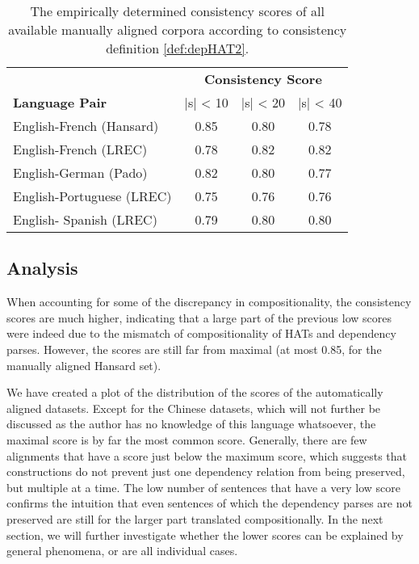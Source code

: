 \begin{table}[!ht]
\centering
\begin{tabular}{|l|c|c|c|}
\hline
&\multicolumn{3}{c|}{\textbf{Consistency Score}}\\
\textbf{Language Pair} & |s| < 10 & |s| < 20 & |s| < 40\\
\hline \hline
English-French (Hansard) & 0.85 & 0.80 & 0.78 \\
\hline
English-French (LREC) & 0.78 & 0.82 & 0.82 \\
\hline
English-German (Pado) & 0.82 & 0.80 & 0.77 \\
\hline
English-Portuguese (LREC) & 0.75 & 0.76 & 0.76 \\
\hline
English- Spanish (LREC) & 0.79 & 0.80 & 0.80\\
\hline
\end{tabular}
\caption{The empirically determined consistency scores of all available manually aligned corpora according to consistency definition \ref{def:depHAT2}.}\label{tab:scores4}
\end{table}

\subsection{Analysis}

When accounting for some of the discrepancy in compositionality, the consistency scores are much higher, indicating that a large part of the previous low scores were indeed due to the mismatch of compositionality of HATs and dependency parses. However, the scores are still far from maximal (at most 0.85, for the manually aligned Hansard set). 

We have created a plot of the distribution of the scores of the automatically aligned datasets. Except for the Chinese datasets, which will not further be discussed as the author has no knowledge of this language whatsoever, the maximal score is by far the most common score. Generally, there are few alignments that have a score just below the maximum score, which suggests that constructions do not prevent just one dependency relation from being preserved, but multiple at a time. The low number of sentences that have a very low score confirms the intuition that even sentences of which the dependency parses are not preserved are still for the larger part translated compositionally. In the next section, we will further investigate whether the lower scores can be explained by general phenomena, or are all individual cases. 

